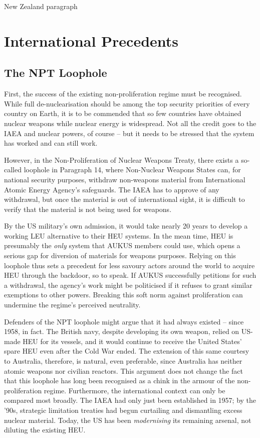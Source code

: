 \documentclass[letterpaper,12pt,twoside]{article} %
\begin{document}
\begin{multicols}{2}
New Zealand paragraph

\vfill
\pagebreak
\section{International Precedents}

\subsection{The NPT Loophole}
First, the success of the existing non-proliferation regime must be recognised. While full de-nuclearisation should be among the top security priorities of every country on Earth, it is to be commended that so few countries have obtained nuclear weapons while nuclear energy is widespread. Not all the credit goes to the IAEA and nuclear powers, of course -- but it needs to be stressed that the system has worked and can still work.

However, in the Non-Proliferation of Nuclear Weapons Treaty, there exists a so-called loophole in Paragraph 14, where Non-Nuclear Weapons States can, for national security purposes, withdraw non-weapons material from International Atomic Energy Agency's safeguards. The IAEA has to approve of any withdrawal, but once the material is out of international sight, it is difficult to verify that the material is not being used for weapons.

By the US military's own admission, it would take nearly 20 years to develop a working LEU alternative to their HEU systems. In the mean time, HEU is presumably the \textit{only} system that AUKUS members could use, which opens a serious gap for diversion of materials for weapons purposes. Relying on this loophole thus sets a precedent for less savoury actors around the world to acquire HEU through the backdoor, so to speak. If AUKUS successfully petitions for such a withdrawal, the agency's work might be politicised if it refuses to grant similar exemptions to other powers. Breaking this soft norm against proliferation can undermine the regime's perceived neutrality.

Defenders of the NPT loophole might argue that it had always existed -- since 1958, in fact. The British navy, despite developing its own weapon, relied on US-made HEU for its vessels, and it would continue to receive the United States' spare HEU even after the Cold War ended.\autocite[39. Footnote 32.]{hippel2016banning} The extension of this same courtesy to Australia, therefore, is natural, even preferable, since Australia has neither atomic weapons nor civilian reactors. This argument does not change the fact that this loophole has long been recognised as a chink in the armour of the non-proliferation regime. Furthermore, the international context can only be compared most broadly. The IAEA had only just been established in 1957; by the '90s, strategic limitation treaties had begun curtailing and dismantling excess nuclear material. Today, the US has been \textit{modernising} its remaining arsenal, not diluting the existing HEU.


\end{multicols}
\end{document}
